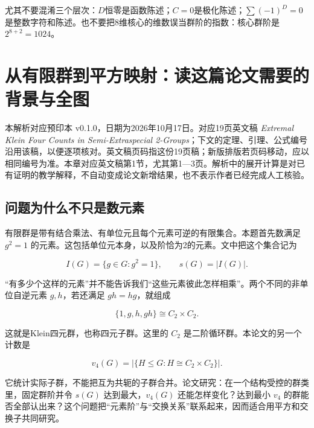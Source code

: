 \documentclass[UTF8,fontset=fandol,zihao=-4,openany,oneside]{ctexbook}
\begin{document}
尤其不要混淆三个层次：\(D\)恒零是函数陈述；\(C=0\)是极化陈述；\(\sum(-1)^D=0\)是整数字符和陈述。也不要把8维核心的维数误当群阶的指数：核心群阶是\(2^{8+2}=1024\)。



\tableofcontents
\mainmatter


\chapter{从有限群到平方映射：读这篇论文需要的背景与全图}


本解析对应预印本 v0.1.0，日期为2026年10月17日。对应19页英文稿 \emph{Extremal Klein Four Counts in Semi-Extraspecial 2-Groups}；下文的定理、引理、公式编号沿用该稿，以便逐项核对。英文稿页码指这份19页稿；新版排版若页码移动，应以相同编号为准。本章对应英文稿第1节，尤其第1—3页。解析中的展开计算是对已有证明的教学解释，不自动变成论文新增结果，也不表示作者已经完成人工核验。



\section{问题为什么不只是数元素}


有限群是带有结合乘法、有单位元且每个元素可逆的有限集合。本题首先数满足 \(g^2=1\) 的元素。这包括单位元本身，以及阶恰为2的元素。文中把这个集合记为



\[
I(G)=\{g\in G:g^2=1\},\qquad s(G)=|I(G)|.
\]



“有多少个这样的元素”并不能告诉我们“这些元素彼此怎样相乘”。两个不同的非单位自逆元素 \(g,h\)，若还满足 \(gh=hg\)，就组成



\[
\{1,g,h,gh\}\cong C_2\times C_2.
\]



这就是Klein四元群，也称四元子群。这里的 \(C_2\) 是二阶循环群。本论文的另一个计数是



\[
v_4(G)=|\{H\le G:H\cong C_2\times C_2\}|.
\]



它统计实际子群，不能把互为共轭的子群合并。论文研究：在一个结构受控的群类里，固定群阶并令 \(s(G)\) 达到最大，\(v_4(G)\) 还能怎样变化？达到最小 \(v_4\) 的群能否全部认出来？这个问题把“元素阶”与“交换关系”联系起来，因而适合用平方和交换子共同研究。



\end{document}
